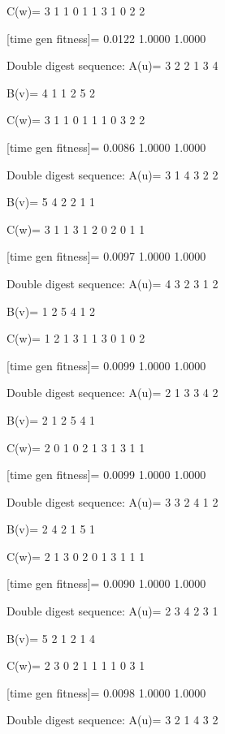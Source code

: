 C(w)=
     3     1     1     0     1     1     3     1     0     2     2

[time gen fitness]=
    0.0122    1.0000    1.0000

Double digest sequence:
A(u)=
     3     2     2     1     3     4

B(v)=
     4     1     1     2     5     2

C(w)=
     3     1     1     0     1     1     1     0     3     2     2

[time gen fitness]=
    0.0086    1.0000    1.0000

Double digest sequence:
A(u)=
     3     1     4     3     2     2

B(v)=
     5     4     2     2     1     1

C(w)=
     3     1     1     3     1     2     0     2     0     1     1

[time gen fitness]=
    0.0097    1.0000    1.0000

Double digest sequence:
A(u)=
     4     3     2     3     1     2

B(v)=
     1     2     5     4     1     2

C(w)=
     1     2     1     3     1     1     3     0     1     0     2

[time gen fitness]=
    0.0099    1.0000    1.0000

Double digest sequence:
A(u)=
     2     1     3     3     4     2

B(v)=
     2     1     2     5     4     1

C(w)=
     2     0     1     0     2     1     3     1     3     1     1

[time gen fitness]=
    0.0099    1.0000    1.0000

Double digest sequence:
A(u)=
     3     3     2     4     1     2

B(v)=
     2     4     2     1     5     1

C(w)=
     2     1     3     0     2     0     1     3     1     1     1

[time gen fitness]=
    0.0090    1.0000    1.0000

Double digest sequence:
A(u)=
     2     3     4     2     3     1

B(v)=
     5     2     1     2     1     4

C(w)=
     2     3     0     2     1     1     1     1     0     3     1

[time gen fitness]=
    0.0098    1.0000    1.0000

Double digest sequence:
A(u)=
     3     2     1     4     3     2

